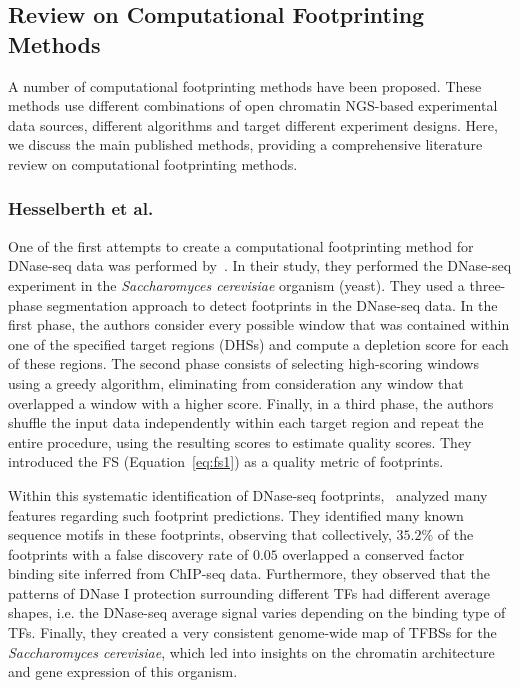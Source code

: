 \subsection{Review on Computational Footprinting Methods}
\label{sec:literature.review}

A number of computational footprinting methods have been proposed. These methods use different combinations of open chromatin NGS-based experimental data sources, different algorithms and target different experiment designs. Here, we discuss the main published methods, providing a comprehensive literature review on computational footprinting methods.

\subsubsection{Hesselberth et al.}

One of the first attempts to create a computational footprinting method for DNase-seq data was performed by~\cite{hesselberth2009}. In their study, they performed the DNase-seq experiment in the \emph{Saccharomyces cerevisiae} organism (yeast). They used a three-phase segmentation approach to detect footprints in the DNase-seq data. In the first phase, the authors consider every possible window that was contained within one of the specified target regions (DHSs) and compute a depletion score for each of these regions. The second phase consists of selecting high-scoring windows using a greedy algorithm, eliminating from consideration any window that overlapped a window with a higher score. Finally, in a third phase, the authors shuffle the input data independently within each target region and repeat the entire procedure, using the resulting scores to estimate quality scores. They introduced the FS (Equation~\ref{eq:fs1}) as a quality metric of footprints.

Within this systematic identification of DNase-seq footprints,~\cite{hesselberth2009} analyzed many features regarding such footprint predictions. They identified many known sequence motifs in these footprints, observing that collectively, $35.2\%$ of the footprints with a false discovery rate of $0.05$ overlapped a conserved factor binding site inferred from ChIP-seq data. Furthermore, they observed that the patterns of DNase I protection surrounding different TFs had different average shapes, i.e. the DNase-seq average signal varies depending on the binding type of TFs. Finally, they created a very consistent genome-wide map of TFBSs for the \emph{Saccharomyces cerevisiae}, which led into insights on the chromatin architecture and gene expression of this organism.

